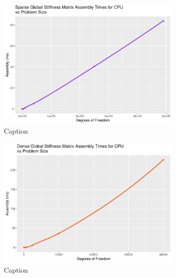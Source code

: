 \begin{figure}
	\centering
	\begin{subfigure}{0.48\linewidth}
		\centering
		\includegraphics[width = \linewidth]{Plots/assembly_sparse_cpu}
		\caption{Caption}
		\label{fig:assem_sparse}
	\end{subfigure}\hfill
	\begin{subfigure}{0.48\linewidth}
		\centering
		\includegraphics[width=\linewidth]{Plots/assembly_dense_cpu}
		\caption{Caption}
		\label{fig:assem_dense}
	\end{subfigure}\\
	\begin{subfigure}{0.48\linewidth}
		\centering

\end{subfigure}
\end{figure}
